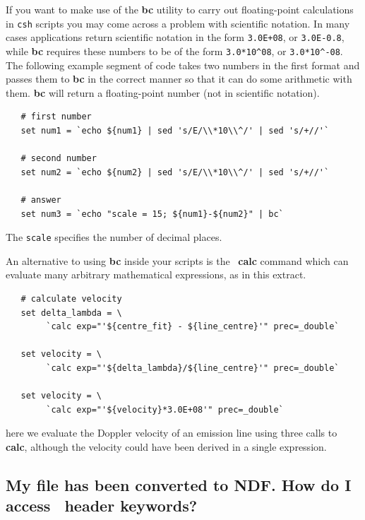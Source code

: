 \documentclass[twoside,11pt]{article}
\newcommand{\xref}[3]{#1}
\newcommand{\xlabel}[1]{}
\begin{document}
{If you want to make use of the {\bf bc} utility to carry out
floating-point calculations in {\tt csh} scripts you may come across a
problem with scientific notation.  In many cases applications return
scientific notation in the form {\tt 3.0E+08}, or {\tt 3.0E-0.8},
while {\bf bc} requires these numbers to be of the form
\verb+3.0*10^08+, or \verb+3.0*10^-08+.  The following example segment
of code takes two numbers in the first format and passes them to {\bf
bc} in the correct manner so that it can do some arithmetic with them.
{\bf bc} will return a floating-point number (not in scientific
notation).

\small\begin{verbatim}
   # first number
   set num1 = `echo ${num1} | sed 's/E/\\*10\\^/' | sed 's/+//'`
   
   # second number
   set num2 = `echo ${num2} | sed 's/E/\\*10\\^/' | sed 's/+//'`
   
   # answer
   set num3 = `echo "scale = 15; ${num1}-${num2}" | bc`
\end{verbatim}\normalsize

The {\tt scale} specifies the number of decimal places.

An alternative to using {\bf bc} inside your scripts is the \KAPPA\
\xref{{\bf calc}}{sun95}{CALC} command which can evaluate many arbitrary
mathematical expressions, as in this extract.

\small\begin{verbatim}
   # calculate velocity
   set delta_lambda = \
        `calc exp="'${centre_fit} - ${line_centre}'" prec=_double`

   set velocity = \
        `calc exp="'${delta_lambda}/${line_centre}'" prec=_double`

   set velocity = \
        `calc exp="'${velocity}*3.0E+08'" prec=_double`
\end{verbatim}\normalsize

here we evaluate the Doppler velocity of an emission line using three calls 
to {\bf calc}, although the velocity could have been derived in a single
expression.

\subsection{\xlabel{sc16_fitsheader}My file has been converted to NDF.
How do I access \FITSref\ header keywords?\label{sc16_fitsheader}}

}
\end{document}
